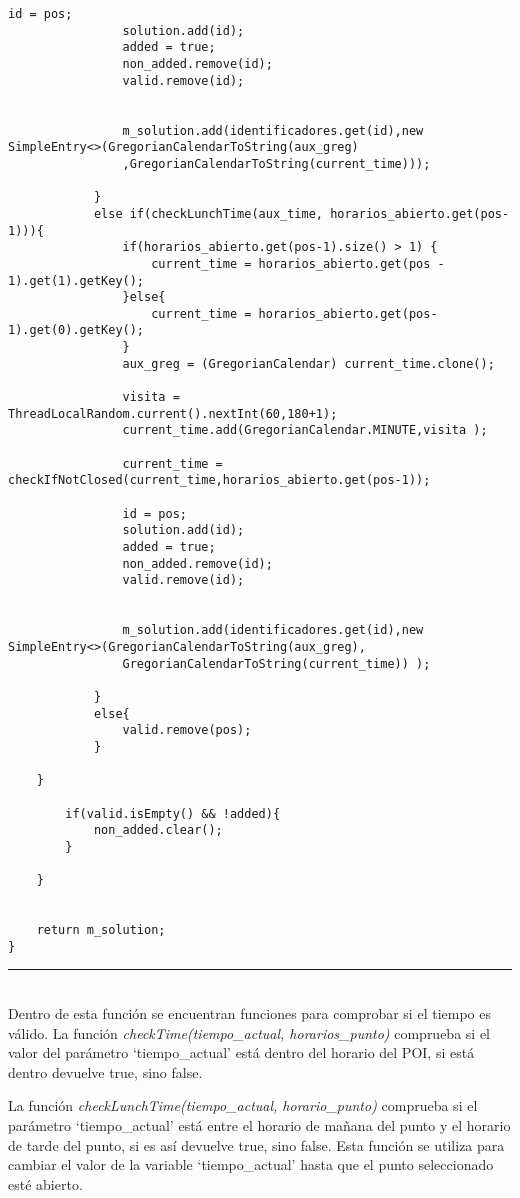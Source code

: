 \begin{lstlisting}[caption=Función para encontrar la ruta entre los puntos seleccionados.]
				id = pos;
				solution.add(id);
				added = true;
				non_added.remove(id);
				valid.remove(id);
				
				
				m_solution.add(identificadores.get(id),new SimpleEntry<>(GregorianCalendarToString(aux_greg)
				,GregorianCalendarToString(current_time)));
						
			} 
			else if(checkLunchTime(aux_time, horarios_abierto.get(pos-1))){
				if(horarios_abierto.get(pos-1).size() > 1) {
					current_time = horarios_abierto.get(pos - 1).get(1).getKey();
				}else{ 
					current_time = horarios_abierto.get(pos-1).get(0).getKey();
				}
				aux_greg = (GregorianCalendar) current_time.clone();
				
				visita = ThreadLocalRandom.current().nextInt(60,180+1);
				current_time.add(GregorianCalendar.MINUTE,visita );
				
				current_time = checkIfNotClosed(current_time,horarios_abierto.get(pos-1));
				
				id = pos;
				solution.add(id);
				added = true;
				non_added.remove(id);
				valid.remove(id);
				
				
				m_solution.add(identificadores.get(id),new SimpleEntry<>(GregorianCalendarToString(aux_greg),
				GregorianCalendarToString(current_time)) );
			
			}
			else{
				valid.remove(pos);
			}
		
	}
	
		if(valid.isEmpty() && !added){
			non_added.clear();
		}
	
	}
	
	
	return m_solution;
}
\end{lstlisting}
\noindent\rule[-1ex]{\textwidth}{1pt}\\

Dentro de esta función se encuentran funciones para comprobar si el tiempo es válido. La función \textit{checkTime(tiempo\_actual, horarios\_punto)} comprueba si el valor del parámetro \enquote*{tiempo\_actual} está dentro del horario del POI, si está dentro devuelve true, sino false.\newline

La función \textit{checkLunchTime(tiempo\_actual, horario\_punto)} comprueba si el parámetro \enquote*{tiempo\_actual} está entre el horario de mañana del punto y el horario de tarde del punto, si es así devuelve true, sino false. Esta función se utiliza para cambiar el valor de la variable \enquote*{tiempo\_actual} hasta que el punto seleccionado esté abierto.


